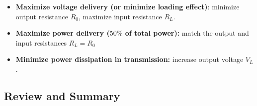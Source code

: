 \documentclass{article}
\begin{document}

\begin{itemize}
\item {\bf Maximize voltage delivery (or minimize loading effect)}:
  minimize output resistance $R_0$, maximize input resistance $R_L$.
\item {\bf Maximize power delivery ($50\%$ of total power): } 
  match the output and input resistances $R_L =R_0$ 
\item {\bf Minimize power dissipation in transmission: } 
  increase output voltage $V_L$.
\end{itemize}

\subsection*{Review and Summary}

\end{document}

